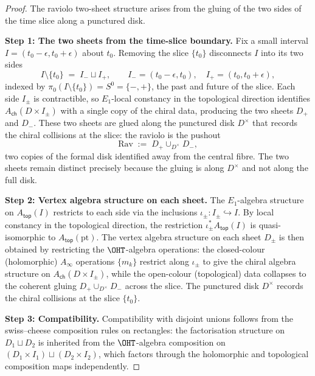 \begin{proof}
The raviolo two-sheet structure arises from the gluing of the two sides of the time slice along a punctured disk.

\medskip\noindent\textbf{Step 1: The two sheets from the time-slice boundary.}
Fix a small interval $I = (t_0 - \epsilon, t_0 + \epsilon)$ about $t_0$. Removing the slice $\{t_0\}$ disconnects $I$ into its two sides
\[
 I \setminus \{t_0\} \;=\; I_- \sqcup I_+,
 \qquad I_- = (t_0 - \epsilon, t_0),\quad I_+ = (t_0, t_0 + \epsilon),
\]
indexed by $\pi_0(I \setminus \{t_0\}) = S^0 = \{-, +\}$, the past and future of the slice. Each side $I_\pm$ is contractible, so $E_1$-local constancy in the topological direction identifies $A_{\mathsf{ch}}(D \times I_\pm)$ with a single copy of the chiral data, producing the two sheets $D_+$ and $D_-$. These two sheets are glued along the punctured disk $D^\times$ that records the chiral collisions at the slice: the raviolo is the pushout
\[
 \mathrm{Rav} \;:=\; D_+ \cup_{D^\times} D_-,
\]
two copies of the formal disk identified away from the central fibre. The two sheets remain distinct precisely because the gluing is along $D^\times$ and not along the full disk.

\medskip\noindent\textbf{Step 2: Vertex algebra structure on each sheet.}
The $E_1$-algebra structure on $A_{\mathsf{top}}(I)$ restricts to each side via the inclusions $\iota_\pm\colon I_\pm \hookrightarrow I$. By local constancy in the topological direction, the restriction $\iota_\pm^* A_{\mathsf{top}}(I)$ is quasi-isomorphic to $A_{\mathsf{top}}(\mathrm{pt})$. The vertex algebra structure on each sheet $D_\pm$ is then obtained by restricting the $\OHT$-algebra operations: the closed-colour (holomorphic) $A_\infty$ operations $\{m_k\}$ restrict along $\iota_\pm$ to give the chiral algebra structure on $A_{\mathsf{ch}}(D \times I_\pm)$, while the open-colour (topological) data collapses to the coherent gluing $D_+ \cup_{D^\times} D_-$ across the slice. The punctured disk $D^\times$ records the chiral collisions at the slice $\{t_0\}$.

\medskip\noindent\textbf{Step 3: Compatibility.}
Compatibility with disjoint unions follows from the swiss--cheese composition rules on rectangles: the factorisation structure on $D_1 \sqcup D_2$ is inherited from the $\OHT$-algebra composition on $(D_1 \times I_1) \sqcup (D_2 \times I_2)$, which factors through the holomorphic and topological composition maps independently.
\end{proof}

